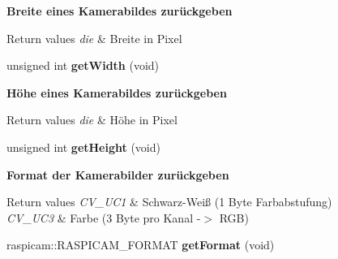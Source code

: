\begin{Indent}{\bf Breite eines Kamerabildes zurückgeben}\par
{\em 
\begin{DoxyRetVals}{Return values}
{\em die} & Breite in Pixel \\
\hline
\end{DoxyRetVals}
}\begin{DoxyCompactItemize}
\item 
\hypertarget{classrc_1_1Camera_a1260f90780be36eb52db9f90d73578e9}{unsigned int {\bfseries get\+Width} (void)}\label{classrc_1_1Camera_a1260f90780be36eb52db9f90d73578e9}

\end{DoxyCompactItemize}
\end{Indent}
\begin{Indent}{\bf Höhe eines Kamerabildes zurückgeben}\par
{\em 
\begin{DoxyRetVals}{Return values}
{\em die} & Höhe in Pixel \\
\hline
\end{DoxyRetVals}
}\begin{DoxyCompactItemize}
\item 
\hypertarget{classrc_1_1Camera_a3a279a087aa5864793aa9c5628bea40a}{unsigned int {\bfseries get\+Height} (void)}\label{classrc_1_1Camera_a3a279a087aa5864793aa9c5628bea40a}

\end{DoxyCompactItemize}
\end{Indent}
\begin{Indent}{\bf Format der Kamerabilder zurückgeben}\par
{\em 
\begin{DoxyRetVals}{Return values}
{\em C\+V\+\_\+U\+C1} & Schwarz-\/\+Weiß (1 Byte Farbabstufung) \\
\hline
{\em C\+V\+\_\+U\+C3} & Farbe (3 Byte pro Kanal -\/$>$ R\+G\+B) \\
\hline
\end{DoxyRetVals}
}\begin{DoxyCompactItemize}
\item 
\hypertarget{classrc_1_1Camera_aa0cd8c29ec174d184ddcd78084258026}{raspicam\+::\+R\+A\+S\+P\+I\+C\+A\+M\+\_\+\+F\+O\+R\+M\+A\+T {\bfseries get\+Format} (void)}\label{classrc_1_1Camera_aa0cd8c29ec174d184ddcd78084258026}

\end{DoxyCompactItemize}
\end{Indent}
